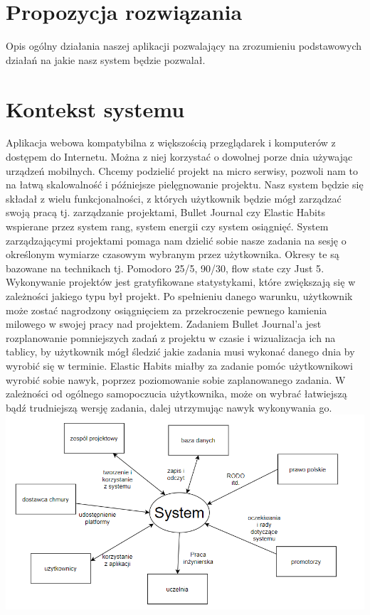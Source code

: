\documentclass[a4paper,11pt]{report}
\begin{document}
\section {Propozycja rozwiązania}
Opis ogólny działania naszej aplikacji pozwalający na zrozumieniu podstawowych działań na jakie nasz system będzie pozwalał.
\section {Kontekst systemu}
Aplikacja webowa kompatybilna z większością przeglądarek i komputerów z dostępem do Internetu. Można z niej korzystać o dowolnej porze dnia używając urządzeń mobilnych. Chcemy podzielić projekt na micro serwisy, pozwoli nam to na łatwą skalowalność i późniejsze pielęgnowanie projektu. Nasz system będzie się składał z wielu funkcjonalności, z których użytkownik będzie mógł zarządzać swoją pracą tj. zarządzanie projektami, Bullet Journal czy Elastic Habits\cite{elastic} wspierane przez system rang, system energii czy system osiągnięć. System zarządzającymi projektami pomaga nam dzielić sobie nasze zadania na sesję o określonym wymiarze czasowym wybranym przez użytkownika. Okresy te są bazowane na technikach tj. Pomodoro 25/5\cite{Pomodoro}, 90/30\cite{90/30}, flow state\cite{flow} czy Just 5\cite{just5}. Wykonywanie projektów jest gratyfikowane statystykami, które zwiększają się w zależności jakiego typu był projekt. Po spełnieniu danego warunku, użytkownik może zostać nagrodzony osiągnięciem za przekroczenie pewnego kamienia milowego w swojej pracy nad projektem. Zadaniem Bullet Journal’a jest rozplanowanie pomniejszych zadań z projektu w czasie i wizualizacja ich na tablicy, by użytkownik mógł śledzić jakie zadania musi wykonać danego dnia by wyrobić się w terminie. Elastic Habits miałby za zadanie pomóc użytkownikowi wyrobić sobie nawyk, poprzez poziomowanie sobie zaplanowanego zadania. W zależności od ogólnego samopoczucia użytkownika, może on wybrać łatwiejszą bądź trudniejszą wersję zadania, dalej utrzymując nawyk wykonywania go. \\
\includegraphics[width=15 cm, left]{system.png}
\end{document}
